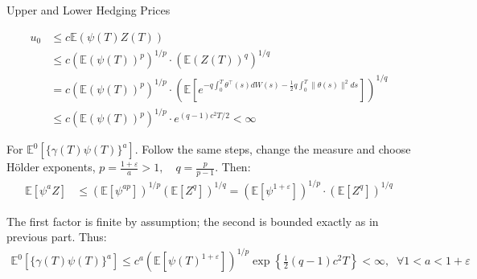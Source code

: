 \documentclass{beamer}
\begin{document}
\begin{frame}{Upper and Lower Hedging Prices}

    {\footnotesize \footnotesize
    \par \begin{align*}
        u_0 &\leq c\mathbb{E}(\psi(T)Z(T)) \\
        &\leq c(\mathbb{E}(\psi(T))^p)^{1/p} \cdot (\mathbb{E}(Z(T))^q)^{1/q} \\
        &= c(\mathbb{E}(\psi(T))^p)^{1/p} \cdot \left( \mathbb{E}\left[ e^{ -q \int_0^T \theta^\top(s)dW(s) -
         \frac{1}{2} q \int_0^T \|\theta(s)\|^2 ds } \right] \right)^{1/q} \\
        &\leq c(\mathbb{E}(\psi(T))^p)^{1/p} \cdot e^{(q-1)c^2 T/2} < \infty
        \end{align*}
    \par For $\mathbb{E}^0[\{\gamma(T)\psi(T)\}^a]$. Follow the same steps, change the measure and choose Hölder exponents, 
    $ p = \frac{1 + \varepsilon}{a} > 1, \quad q = \frac{p}{p - 1}$. Then:
    \begin{align*}
        \mathbb{E}[\psi^a Z] &\leq \left( \mathbb{E}[\psi^{ap}] \right)^{1/p} \left( \mathbb{E}[Z^q] \right)^{1/q}=
         \left( \mathbb{E}[\psi^{1 + \varepsilon}] \right)^{1/p} \cdot \left( \mathbb{E}[Z^q] \right)^{1/q}
    \end{align*}
    \par  The first factor is finite by assumption; the second is bounded exactly as in previous part. Thus:
    \begin{align*}
        \mathbb{E}^0[\{\gamma(T)\psi(T)\}^a] \leq c^a \left( \mathbb{E}[\psi(T)^{1 + \varepsilon}] \right)^{1/p} \exp \left\{ \frac{1}{2}(q - 1)c^2T \right\} < \infty
        ,\;\;\forall 1 < a < 1 + \varepsilon
    \end{align*}
    }
\end{frame} 
\end{document}
